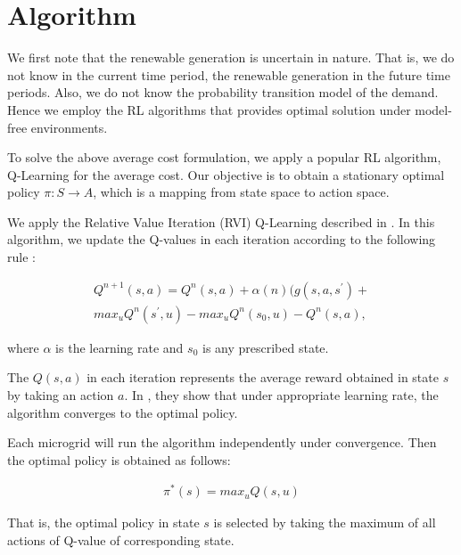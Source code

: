 \section{Algorithm}
We first note that the renewable generation is uncertain in nature. That is, we do not know in the current time period, the renewable generation in the future time periods. Also, we do not know the probability transition model of the demand. Hence we employ the RL algorithms that provides optimal solution under model-free environments.

To solve the above average cost formulation, we apply a popular RL algorithm, Q-Learning for the average cost. Our objective is to obtain a stationary optimal policy $\pi : S \rightarrow A$, which is a mapping from state space to action space.  

We apply the Relative Value Iteration (RVI) Q-Learning described in \cite{avgcost}. In this algorithm, we update the Q-values in each iteration according to the following rule :

\begin{align}
Q^{n+1}(s,a) = Q^{n}(s,a) + \alpha(n)(g(s,a,s^{'}) + \\ max_{u} Q^{n}(s^{'},u) - max_{u} Q^{n}(s_{0},u) - Q^{n}(s,a),
\end{align}

where $\alpha$ is the learning rate and $s_{0}$ is any prescribed state.

The $Q(s,a)$ in each iteration represents the average reward obtained in state $s$ by taking an action $a$. In \cite{avgcost}, they show that under appropriate learning rate, the algorithm converges to the  optimal policy. 

Each microgrid will run the algorithm independently under convergence. Then the optimal policy is obtained as follows:

\begin{align}
\pi^{*}(s) = max_{u}Q(s,u)
\end{align}

That is, the optimal policy in state $s$ is selected by taking the maximum of all actions of Q-value of corresponding state. 

